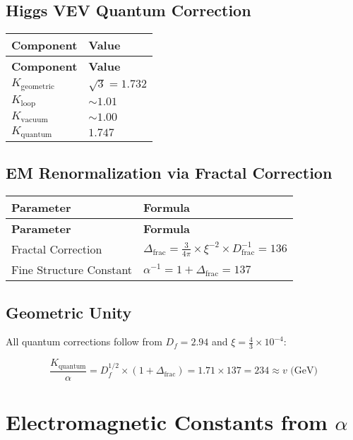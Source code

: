 \documentclass[12pt,a4paper]{article}
\begin{document}
	\subsection{Higgs VEV Quantum Correction}
	
	\begin{longtable}{|p{3cm}|p{4cm}|}
		\hline
		\textbf{Component} & \textbf{Value} \\
		\hline
		\endfirsthead
		\hline
		\textbf{Component} & \textbf{Value} \\
		\hline
		\endhead
		\(K_{\text{geometric}}\) & \(\sqrt{3} = 1.732\) \\
		\hline
		\(K_{\text{loop}}\) & \(\sim 1.01\) \\
		\hline
		\(K_{\text{vacuum}}\) & \(\sim 1.00\) \\
		\hline
		\(K_{\text{quantum}}\) & \(1.747\) \\
		\hline
	\end{longtable}
	
	\subsection{EM Renormalization via Fractal Correction}
	
	\begin{longtable}{|p{4cm}|p{5cm}|}
		\hline
		\textbf{Parameter} & \textbf{Formula} \\
		\hline
		\endfirsthead
		\hline
		\textbf{Parameter} & \textbf{Formula} \\
		\hline
		\endhead
		Fractal Correction & \(\Delta_{\text{frac}} = \frac{3}{4\pi} \times \xi^{-2} \times D_{\text{frac}}^{-1} = 136\) \\
		\hline
		Fine Structure Constant & \(\alpha^{-1} = 1 + \Delta_{\text{frac}} = 137\) \\
		\hline
	\end{longtable}
	
	\subsection{Geometric Unity}
	
	All quantum corrections follow from \(D_f = 2.94\) and \(\xi = \frac{4}{3} \times 10^{-4}\):
	
	\begin{equation}
		\frac{K_{\text{quantum}}}{\alpha} = D_f^{1/2} \times (1 + \Delta_{\text{frac}}) = 1.71 \times 137 = 234 \approx v \text{ (GeV)}
	\end{equation}
	\section{Electromagnetic Constants from \(\alpha\)}
	
\end{document}
